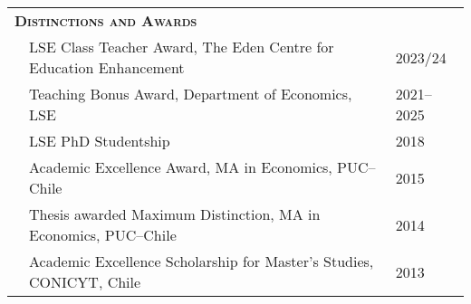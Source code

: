 \begin{tabular}{lll}
	
	\multicolumn{3}{l}{
		\large
		\textbf{%
			\textsc{%
				Distinctions and Awards
			}
		}
	}
	\\[2ex]
	
	  \indent

	& LSE Class Teacher Award, The Eden Centre for Education Enhancement
	& 2023/24
	\\[.5ex]
	
	& Teaching Bonus Award, Department of Economics, LSE
	& 2021--2025
	\\[.5ex]
	
	& LSE PhD Studentship
	& 2018
	\\[.5ex]
	
	& Academic Excellence Award, MA in Economics, PUC--Chile
	& 2015
	\\[.5ex]
	
	& Thesis awarded Maximum Distinction, MA in Economics, PUC--Chile
	& 2014
	\\[.5ex]
	
	& Academic Excellence Scholarship for Master's Studies, CONICYT, Chile
	& 2013
	
\end{tabular}
